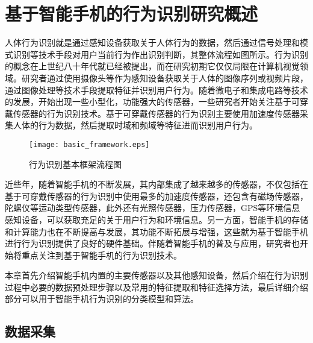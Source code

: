 \chapter{基于智能手机的行为识别研究概述}
\par 人体行为识别就是通过感知设备获取关于人体行为的数据，然后通过信号处理和模式识别等技术手段对用户当前行为作出识别判断，其整体流程如图所示。行为识别的概念在上世纪八十年代就已经被提出，而在研究初期它仅仅局限在计算机视觉领域。研究者通过使用摄像头等作为感知设备获取关于人体的图像序列或视频片段，通过图像处理等技术手段提取特征并识别用户行为。随着微电子和集成电路等技术的发展，开始出现一些小型化，功能强大的传感器，一些研究者开始关注基于可穿戴传感器的行为识别技术。基于可穿戴传感器的行为识别主要使用加速度传感器采集人体的行为数据，然后提取时域和频域等特征进而识别用户行为。

\begin{figure}[htb]
\centering
\texttt{[image: basic\_framework.eps]}
\caption{行为识别基本框架流程图}
\end{figure}

\par 近些年，随着智能手机的不断发展，其内部集成了越来越多的传感器，不仅包括在基于可穿戴传感器的行为识别中使用最多的加速度传感器，还包含有磁场传感器，陀螺仪等运动类型传感器，此外还有光照传感器，压力传感器，GPS等环境信息感知设备，可以获取充足的关于用户行为和环境信息。另一方面，智能手机的存储和计算能力也在不断提高与发展，其功能不断拓展与增强，这些就为基于智能手机进行行为识别提供了良好的硬件基础。伴随着智能手机的普及与应用，研究者也开始将重点关注到基于智能手机的行为识别技术。
\par 本章首先介绍智能手机内置的主要传感器以及其他感知设备，然后介绍在行为识别过程中必要的数据预处理步骤以及常用的特征提取和特征选择方法，最后详细介绍部分可以用于智能手机行为识别的分类模型和算法。

\section{数据采集}
